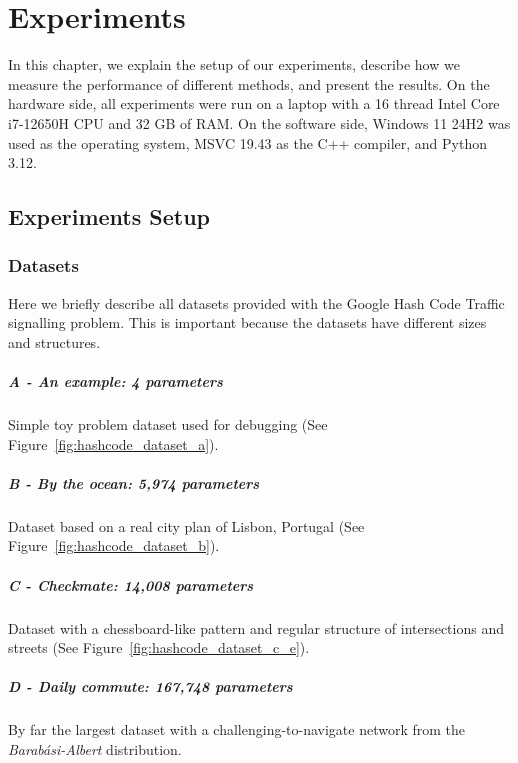 \chapter{Experiments}

In this chapter, we explain the setup of our experiments, describe how we measure the performance of different methods, and present the results.
On the hardware side, all experiments were run on a laptop with a 16 thread Intel Core i7-12650H CPU and 32 GB of RAM. On the software side, Windows 11 24H2 was used as the operating system, MSVC 19.43 as the C++ compiler, and Python 3.12.

\section{Experiments Setup}

\subsection{Datasets}

Here we briefly describe all datasets provided with the Google Hash Code Traffic signalling problem. This is important because the datasets have different sizes and structures.

\paragraph{A - An example: 4 parameters} Simple toy problem dataset used for debugging (See Figure~\ref{fig:hashcode_dataset_a}).

\paragraph{B - By the ocean: 5,974 parameters} Dataset based on a real city plan of Lisbon, Portugal (See Figure~\ref{fig:hashcode_dataset_b}).

\paragraph{C - Checkmate: 14,008 parameters} Dataset with a chessboard-like pattern and regular structure of intersections and streets (See Figure~\ref{fig:hashcode_dataset_c_e}).

\paragraph{D - Daily commute: 167,748 parameters} By far the largest dataset with a challenging-to-navigate network from the \textit{Barabási-Albert} distribution.

